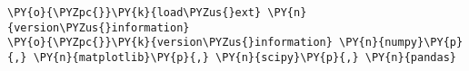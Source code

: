 
{\par%
\vspace{-1\baselineskip}%
}%
\begin{notebookcell}[1]%
\begin{addmargin}[\cellleftmargin]{0em}%
{\smaller%
\par%
%
\vspace{-1\smallerfontscale}%
\begin{Verbatim}[commandchars=\\\{\}]
\PY{o}{\PYZpc{}}\PY{k}{load\PYZus{}ext} \PY{n}{version\PYZus{}information}
\PY{o}{\PYZpc{}}\PY{k}{version\PYZus{}information} \PY{n}{numpy}\PY{p}{,} \PY{n}{matplotlib}\PY{p}{,} \PY{n}{scipy}\PY{p}{,} \PY{n}{pandas}
\end{Verbatim}
%
\par%
\vspace{-1\smallerfontscale}}%
\end{addmargin}
\end{notebookcell}

\par\vspace{1\smallerfontscale}%
    
